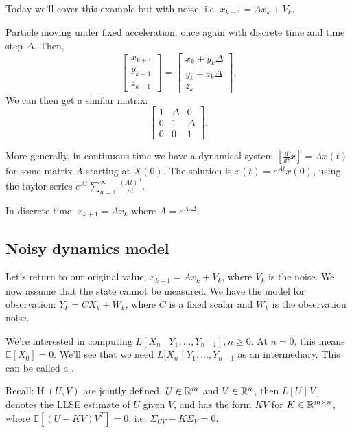 \documentclass{article}
\newcommand{\EE}{\mathbb{E}}
\begin{document}
Today we'll cover this example but with noise, i.e. $x_{k+1} = Ax_{k} + V_k$.

\begin{example}
	Particle moving under fixed acceleration, once again with discrete time and time step $\Delta$. Then, 
	\[\begin{bmatrix}x_{k+1} \\ y_{k+1} \\ z_{k+1} \end{bmatrix} = \begin{bmatrix} x_{k} + y_{k} \Delta \\ y_{k} + z_{k} \Delta \\ z_k \end{bmatrix}.\] We can then get a similar matrix: \[\begin{bmatrix} 1 & \Delta & 0 \\ 0 & 1 & \Delta \\ 0 & 0 & 1 \end{bmatrix}.\]
\end{example}

More generally, in continuous time we have a dynamical system $\left[\frac{d}{dt} x\right] = A x(t)$ for some matrix $A$ starting at $X(0)$. 
The solution is $x(t) = e^{At} x(0)$, using the taylor series $e^{At} \sum_{n = 1}^\infty \frac{(At)^n}{n!}$.

In discrete time, $x_{k+1} = Ax_k$ where $A = e^{A_c \Delta}$.

\subsection{Noisy dynamics model}
Let's return to our original value, 
$x_{k+1} = Ax_{k} + V_{k}$, where $V_k$ is the noise. We now assume that the state cannot be measured. 
We have the model for observation: $Y_k = CX_k + W_k$, where $C$ is a fixed scalar and $W_k$ is the observation noise.

We're interested in computing $L[X_n \mid Y_1, \ldots, Y_{n-1}], n \geq 0$. At $n = 0$, this means $\EE[X_0] = 0$.
We'll see that we need $L[X_n \mid Y_1, \ldots, Y_{n-1}$ as an intermediary. This can be called a .

Recall: If $(U, V)$ are jointly defined, $U \in \mathbb R^m$ and $V \in \mathbb R^n$, then $L[U \mid V]$ denotes the LLSE estimate of $U$ given $V$, and has the form $KV$ for $K \in \mathbb R^{m \times n}$, where $\EE[(U - KV) V^T] = 0$, i.e. $\Sigma_{UV} - K\Sigma_V = 0$.
\end{document}
